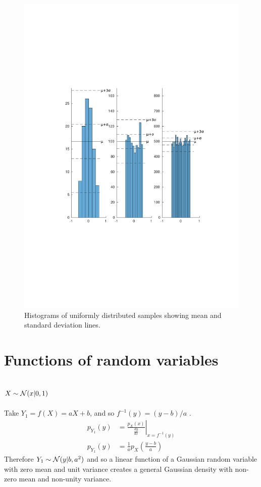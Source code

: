 \documentclass[12pt]{article}
\begin{document}
\begin{figure}[H]
\includegraphics[width=\textwidth]{figures/uniform-bar-distribution.pdf}
  \caption{Histograms of uniformly distributed samples showing mean and standard deviation lines.}
  \label{fig:hist-dist}
\end{figure}


\section{Functions of random variables}

\subsection{$X \sim {\cal N}(x|0,1)$}

Take ${Y_1} = f(X) = aX + b$, and so $f^{-1}(y) = (y - b) / a$ .
\begin{align}
p_{Y_1}(y) &= \left. \frac {p_X(x)} {\frac {dy} {dx}} \right|_{x = f^ {-1} (y)} \nonumber \\
p_{Y_1}(y) &= \frac 1 a  {p_X \left (\frac {y - b} a \right)}
\end{align}
Therefore $Y_1 \sim {\cal N}(y|b, a^2)$ and so a linear function of a Gaussian random variable with zero mean and unit variance creates a general Gaussian density with non-zero mean and non-unity variance.
\end{document}
